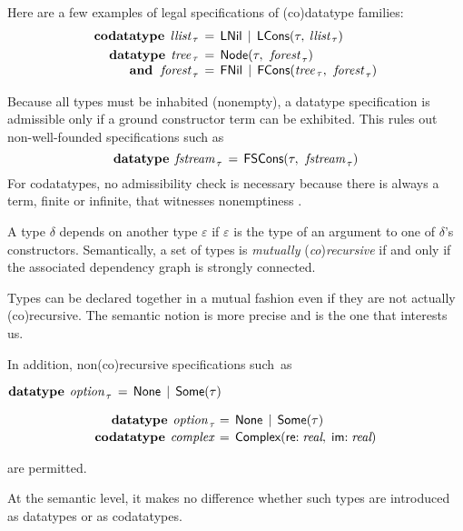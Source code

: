 \begin{rep}%
Here are a few examples of legal specifications of (co)datatype families:
\[\begin{aligned}[t]
      \keyw{codatatype}\; \,\ty{llist}_{\,\tau} & \,=\, \const{LNil} \,\mid\, \const{LCons}(%
      \tau,\: %
      \ty{llist}_{\,\tau}) \\%
      \keyw{datatype}\;\, \ty{tree}_{\,\tau} & \,=\, \const{Node}(\tau,\:\, \ty{forest}_{\,\tau}) \\[-\jot]
      \keyw{and}\;\,\, \ty{forest}_{\,\tau} & \,=\, \const{FNil} \,\mid\, \const{FCons}(\ty{tree}_{\,\tau},\:\, \ty{forest}_{\,\tau})
\end{aligned}
\]

Because all types must be inhabited (nonempty), a datatype specification is
admissible only if a ground constructor term can be exhibited.
This rules out non-well-founded specifications such as
\[\textbf{datatype}\;\, \textit{fstream}_{\,\tau} \,=\, \textsf{FSCons}(\tau,\:\, \textit{fstream}_{\,\tau})\]
For codatatypes, no admissibility check is necessary because there is always a term,
finite or infinite, that witnesses nonemptiness \cite{blanchette-et-al-2015-esop}.
\end{rep}

A type $\delta$ depends on another type $\varepsilon$ if $\varepsilon$ is the
type of an argument to one of $\delta$'s constructors. Semantically, a set of
types is \emph{mutually} (\emph{co})\emph{recursive} if and only if the
associated dependency graph is strongly connected.
\begin{rep}%
Types can be declared together in a mutual fashion even if they are not actually
(co)recursive. The semantic notion is more precise and is the one that interests
us.
\end{rep}%
%
In addition, non(co)recursive specifications
such~as
\begin{conf}%
\vthinspace$\keyw{datatype}~\vthinspace\ty{option}_{\,\tau} \,=\, \const{None} \,\mid\, \const{Some}(\tau)$
\end{conf}%
\begin{rep}%
\[\begin{aligned}[t]
      \keyw{datatype}~\vthinspace\ty{option}_{\,\tau\!} & \,=\, \const{None} \,\mid\, \const{Some}(\tau) \\[-.5\jot]
      \keyw{codatatype}~\vthinspace\ty{complex} & \,=\, \const{Complex}(\const{re}{:}\; \ty{real},\; \const{im}{:}\;\ty{real})
\end{aligned}
\]
\end{rep}%
are permitted.
\begin{rep}At the semantic level, it makes no difference whether
such types are introduced as datatypes or as codatatypes.
\end{rep}%

